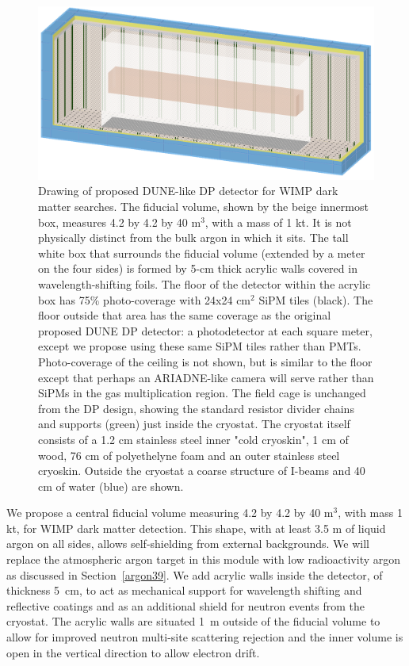 \documentclass[a4paper,11pt]{article}
\begin{document}
\begin{figure}[t]
\begin{centering}
\includegraphics[width=1.00\columnwidth]{Figures/DuneCADModelV5.png}
\par\end{centering}
\caption{Drawing of proposed DUNE-like DP detector for WIMP dark matter searches. The fiducial volume, shown by the beige innermost box, measures 4.2 by 4.2 by 40 m$^3$, with a mass of 1 kt. It is not physically distinct from the bulk argon in which it sits. The tall white box that surrounds the fiducial volume (extended by a meter on the four sides) is formed by 5-cm thick acrylic walls covered in wavelength-shifting foils. The floor of the detector within the acrylic box has 75\% photo-coverage with 24x24 cm$^2$ SiPM tiles (black). The floor outside that area has the same coverage as the original proposed DUNE DP detector: a photodetector at each square meter, except we propose using these same SiPM tiles rather than PMTs. Photo-coverage of the ceiling is not shown, but is similar to the floor except that perhaps an ARIADNE-like camera will serve rather than SiPMs in the gas multiplication region. The field cage is unchanged from the DP design, showing the standard resistor divider chains and supports (green) just inside the cryostat. The cryostat itself consists of a 1.2 cm stainless steel inner "cold cryoskin", 1 cm of wood, 76 cm of polyethelyne foam and an outer stainless steel cryoskin. Outside the cryostat a coarse structure of I-beams and 40 cm of water (blue) are shown. \label{fig:dunecad}}
\end{figure}

We propose a central fiducial volume measuring 4.2 by 4.2 by 40 m$^3$, with mass 1 kt, for WIMP dark matter detection. This shape, with at least 3.5 m of liquid argon on all sides, allows self-shielding from external backgrounds. We will replace the atmospheric argon target in this module with low radioactivity argon as discussed in Section~\ref{argon39}. We add acrylic walls inside the detector, of thickness 5~cm, to act as mechanical support for wavelength shifting and reflective coatings and as an additional shield for neutron events from the cryostat. The acrylic walls are situated 1~m outside of the fiducial volume to allow for improved neutron multi-site scattering rejection and the inner volume is open in the vertical direction to allow electron drift.
\end{document}
